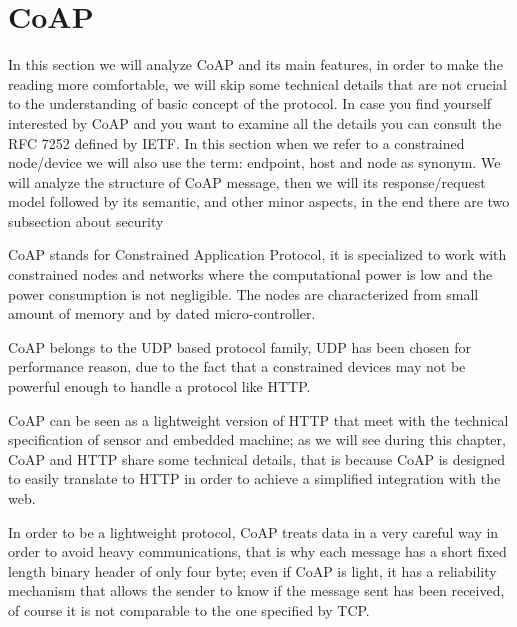 
	\section{CoAP}
	In this section we will analyze CoAP and its main features, in order to make the reading more comfortable,
	we will skip some technical details that are not crucial to the understanding of basic concept of the protocol.\newline
	In case you find yourself interested by CoAP and you want to examine all the details you can consult
	the RFC 7252 defined by IETF. \newline
	In this section when we refer to a constrained node/device we will also use the term: endpoint, host and node as synonym.\newline
	We will analyze the structure of CoAP message, then we will its response/request model followed by its semantic, and other minor aspects, in the end there are two subsection about security\newline
	
	CoAP stands for Constrained Application Protocol, it is specialized to work with constrained nodes and networks where the computational power is low and the power consumption is not negligible.\newline
	The nodes are characterized from small amount of memory and by dated micro-controller.\newline

	CoAP belongs to the UDP based protocol family, UDP has been chosen for performance reason, due to the fact that a
	constrained devices may not be powerful enough to handle a protocol like HTTP.\newline
	
	CoAP can be seen as a lightweight version of HTTP that meet with the technical specification of sensor and embedded machine; as we will see during this chapter, CoAP and HTTP share some technical details, that is because CoAP is designed to easily translate to HTTP in order to achieve a simplified integration with the web.\newline

	In order to be a lightweight protocol, CoAP treats data in a very careful way in order to avoid heavy communications, that is why each message has a short fixed length binary header of only four byte; even if CoAP is light, it has a reliability mechanism that allows the sender to know if the message sent has been received, of course it is not comparable to the one specified by TCP.\newline
	
